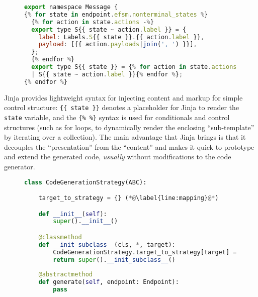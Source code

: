 \begin{figure}[!ht]
\begin{lstlisting}[language=javascript, title=efsm.ts.j2]
export namespace Message {
{% for state in endpoint.efsm.nonterminal_states %}
  {% for action in state.actions -%}
  export type S{{ state ~ action.label }} = {
    label: Labels.S{{ state }}.{{ action.label }},
    payload: [{{ action.payloads|join(', ') }}],
  };
  {% endfor %}
  export type S{{ state }} = {% for action in state.actions -%}
  | S{{ state ~ action.label }}{% endfor %};
{% endfor %}
\end{lstlisting}
\label{lst:jinja}
\end{figure}

Jinja provides lightweight syntax for injecting content and
markup for simple control structure: \texttt{\{\{ state \}\}} 
denotes a placeholder for Jinja to render the \texttt{state} variable,
and the \texttt{\{\% \%\}} syntax  is used for conditionals and
control structures 
(such as for loops, to dynamically render the enclosing ``sub-template''
by iterating over a collection).
The main advantage that Jinja brings is that 
it decouples the ``presentation''
from the ``content'' and makes it quick to prototype and extend
the generated code, \textit{usually} without modifications to the 
code generator.

\begin{figure}[!ht]
\begin{lstlisting}[language=python]
class CodeGenerationStrategy(ABC):

    target_to_strategy = {} (*@\label{line:mapping}@*)

    def __init__(self):
        super().__init__()

    @classmethod
    def __init_subclass__(cls, *, target):
        CodeGenerationStrategy.target_to_strategy[target] = cls (*@\label{line:register}@*)
        return super().__init_subclass__()
    
    @abstractmethod
    def generate(self, endpoint: Endpoint):
        pass
\end{lstlisting}
\label{lst:codegenerationstrategy}
\end{figure}


